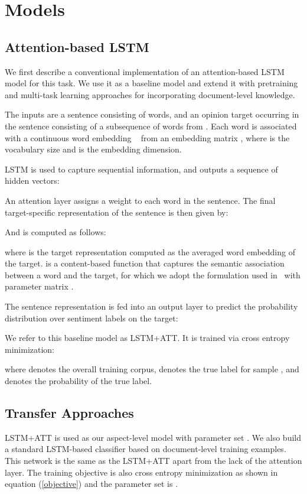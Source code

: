 \documentclass[11pt,a4paper]{article}
\begin{document}
\section{Models}
\subsection{Attention-based LSTM}
We first describe a conventional implementation of an attention-based LSTM model for this task. We use it as a baseline model and extend it with pretraining and multi-task learning approaches for incorporating document-level knowledge. 

The inputs are a sentence  consisting of  words, and an opinion target  occurring in the sentence consisting of a subsequence of  words from . Each word is associated with a continuous word embedding  ~\cite{Mikolov:13} from an embedding matrix , where  is the vocabulary size and  is the embedding dimension.

LSTM is used to capture sequential information, and outputs a sequence of hidden vectors:

An attention layer assigns a weight  to each word in the sentence. The final target-specific representation of the sentence  is then given by:

And  is computed as follows:

where  is the target representation computed as the averaged word embedding of the target.  is a content-based function that captures the semantic association between a word and the target, for which we adopt the formulation used in~\cite{Luong:15b,He:17} with parameter matrix . 

The sentence representation  is fed into an output layer to predict the probability distribution  over sentiment labels on the target:

We refer to this baseline model as LSTM+ATT. It is trained via cross entropy minimization:

where  denotes the overall training corpus,  denotes the true label for sample , and  denotes the probability of the true label.


\subsection{Transfer Approaches}
LSTM+ATT is used as our aspect-level model with parameter set . We also build a standard LSTM-based classifier based on document-level training examples. This network is the same as the LSTM+ATT apart from the lack of the attention layer. The training objective is also cross entropy minimization as shown in equation (\ref{objective}) and the parameter set is .
\medskip
\end{document}
